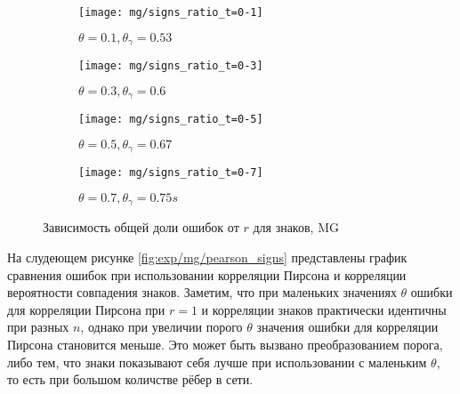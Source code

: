 \begin{figure}[H]
     \centering
     \begin{subfigure}[b]{0.49\textwidth}
         \centering
         \texttt{[image: mg/signs\_ratio\_t=0-1]}
         \caption{$\theta=0.1, \theta_\gamma=0.53$}
     \end{subfigure}
     \hfill
     \begin{subfigure}[b]{0.49\textwidth}
         \centering
         \texttt{[image: mg/signs\_ratio\_t=0-3]}
         \caption{$\theta=0.3, \theta_\gamma=0.6$}
     \end{subfigure}
     \vfill
     \begin{subfigure}[b]{0.49\textwidth}
         \centering
         \texttt{[image: mg/signs\_ratio\_t=0-5]}
         \caption{$\theta=0.5, \theta_\gamma=0.67$}
     \end{subfigure}
     \hfill
     \begin{subfigure}[b]{0.49\textwidth}
         \centering
         \texttt{[image: mg/signs\_ratio\_t=0-7]}
         \caption{$\theta=0.7,\theta_\gamma=0.75s$}
     \end{subfigure}
     

        \caption{Зависимость общей доли ошибок от $r$ для знаков, MG}
        \label{fig:exp/mg/signs_ration}
\end{figure}  


На слудеющем рисунке \ref{fig:exp/mg/pearson_signs} представлены график сравнения ошибок при использовании корреляции Пирсона и корреляции вероятности совпадения знаков. Заметим, что при маленьких значениях $\theta$ ошибки для корреляции Пирсона при $r=1$ и корреляции знаков практически идентичны при разных $n$, однако при увеличии порого $\theta$ значения ошибки для корреляции Пирсона становится меньше. Это может быть вызвано преобразованием порога, либо тем, что знаки показывают себя лучше при использовании с маленьким $\theta$, то есть при большом количстве рёбер в сети.

